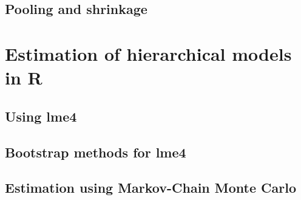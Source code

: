 \documentclass[a4paper,12pt]{article}
\begin{document}

\subsection{Pooling and shrinkage}
\label{sec:poolingandshrinkage}


\section{Estimation of hierarchical models in R}
\label{sec:estimationofhierarchicalmodelsinr}

\subsection{Using lme4}
\label{sec:usinglme4}


\subsection{Bootstrap methods for lme4}
\label{sec:bootstrapestimationforlme4}

\subsection{Estimation using Markov-Chain Monte Carlo}
\label{sec:estimationusingmarkovchainmontecarlo}


%
%


\printbibliography
\end{document}
